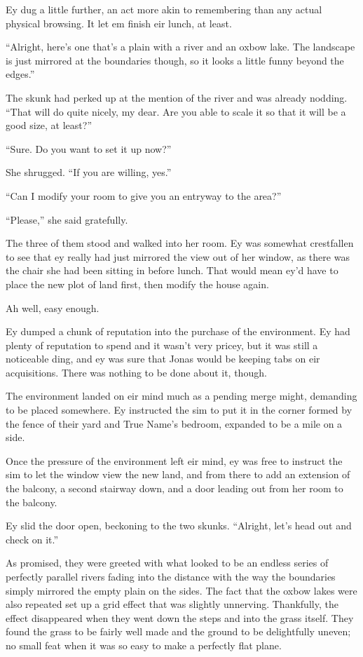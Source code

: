 Ey dug a little further, an act more akin to remembering than any actual physical browsing. It let em finish eir lunch, at least.

``Alright, here's one that's a plain with a river and an oxbow lake. The landscape is just mirrored at the boundaries though, so it looks a little funny beyond the edges.''

The skunk had perked up at the mention of the river and was already nodding. ``That will do quite nicely, my dear. Are you able to scale it so that it will be a good size, at least?''

``Sure. Do you want to set it up now?''

She shrugged. ``If you are willing, yes.''

``Can I modify your room to give you an entryway to the area?''

``Please,'' she said gratefully.

The three of them stood and walked into her room. Ey was somewhat crestfallen to see that ey really had just mirrored the view out of her window, as there was the chair she had been sitting in before lunch. That would mean ey'd have to place the new plot of land first, then modify the house again.

Ah well, easy enough.

Ey dumped a chunk of reputation into the purchase of the environment. Ey had plenty of reputation to spend and it wasn't very pricey, but it was still a noticeable ding, and ey was sure that Jonas would be keeping tabs on eir acquisitions. There was nothing to be done about it, though.

The environment landed on eir mind much as a pending merge might, demanding to be placed somewhere. Ey instructed the sim to put it in the corner formed by the fence of their yard and True Name's bedroom, expanded to be a mile on a side.

Once the pressure of the environment left eir mind, ey was free to instruct the sim to let the window view the new land, and from there to add an extension of the balcony, a second stairway down, and a door leading out from her room to the balcony.

Ey slid the door open, beckoning to the two skunks. ``Alright, let's head out and check on it.''

As promised, they were greeted with what looked to be an endless series of perfectly parallel rivers fading into the distance with the way the boundaries simply mirrored the empty plain on the sides. The fact that the oxbow lakes were also repeated set up a grid effect that was slightly unnerving. Thankfully, the effect disappeared when they went down the steps and into the grass itself. They found the grass to be fairly well made and the ground to be delightfully uneven; no small feat when it was so easy to make a perfectly flat plane.

